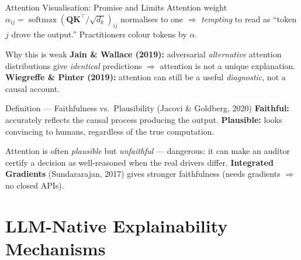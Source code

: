\documentclass[9pt,t]{beamer}
\begin{document}
\begin{frame}{Attention Visualisation: Promise and Limits}
Attention weight $\alpha_{ij}=\operatorname{softmax}(\mathbf{Q}\mathbf{K}^\top/\sqrt{d_k})_{ij}$
normalises to one $\Rightarrow$ \emph{tempting} to read as ``token $j$ drove the
output.'' Practitioners colour tokens by $\alpha$.

\medskip
\begin{alertblock}{Why this is weak}
\textbf{Jain \& Wallace (2019):} adversarial \emph{alternative} attention
distributions give \emph{identical} predictions $\Rightarrow$ attention is not a
unique explanation. \textbf{Wiegreffe \& Pinter (2019):} attention can still be a
useful \emph{diagnostic}, not a causal account.
\end{alertblock}

\begin{block}{Definition --- Faithfulness vs.\ Plausibility (Jacovi \& Goldberg, 2020)}
\textbf{Faithful:} accurately reflects the causal process producing the output.
\textbf{Plausible:} looks convincing to humans, regardless of the true computation.
\end{block}

\medskip
Attention is often \emph{plausible} but \emph{unfaithful} --- dangerous: it can
make an auditor certify a decision as well-reasoned when the real drivers differ.
\textbf{Integrated Gradients} (Sundararajan, 2017) gives stronger faithfulness
(needs gradients $\Rightarrow$ no closed APIs).
\end{frame}

\section{LLM-Native Explainability Mechanisms}
\end{document}
